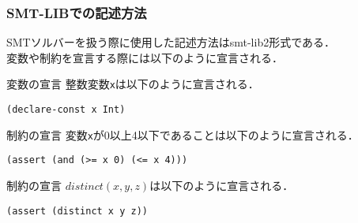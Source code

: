 
\begin{frame}[fragile]\small
    \frametitle{SMT-LIBでの記述方法}
    SMTソルバーを扱う際に使用した記述方法はsmt-lib2形式である．\\
    変数や制約を宣言する際には以下のように宣言される．
    \begin{exampleblock}{変数の宣言}
        整数変数\verb|x|は以下のように宣言される．
\begin{verbatim}
(declare-const x Int)
\end{verbatim}
    \end{exampleblock}
    \begin{exampleblock}{制約の宣言}
        変数\verb|x|が0以上4以下であることは以下のように宣言される．
\begin{verbatim}
(assert (and (>= x 0) (<= x 4)))
\end{verbatim}
    \end{exampleblock}
    \begin{exampleblock}{\distinct 制約の宣言}
        $distinct(x,y,z)$は以下のように宣言される．
\begin{verbatim}
(assert (distinct x y z))
\end{verbatim}
    \end{exampleblock}
\end{frame}

